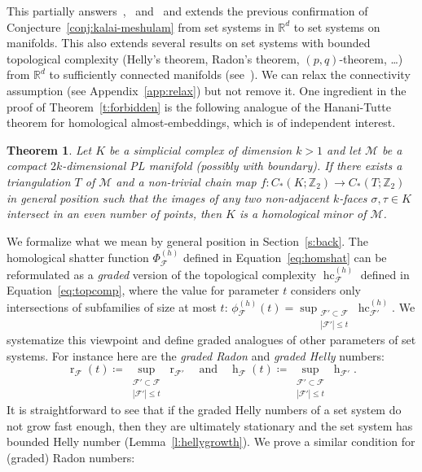 \documentclass[11pt]{article}
\newcommand{\R}{\mathbb{R}}
\newcommand{\Z}{\mathbb{Z}}
\newcommand{\F}{\mathcal{F}}
\newcommand{\M}{\mathcal{M}}
\DeclareMathOperator{\h}{h}
\DeclareMathOperator{\rad}{r}
\DeclareMathOperator{\hc}{hc}
\newcommand{\defn}[1]{\emph{\color{violet}#1}}
\newtheorem{theorem}{Theorem}
\begin{document}
%
\noindent
This partially answers~\cite[Problem~3]{patakova2022bounding},~\cite[Conjecture~1.7]{steppingUp} and~\cite[Conjecture~2]{patak2025sharper} and extends the previous confirmation of Conjecture~\ref{conj:kalai-meshulam} from set systems in $\R^d$ to set systems on manifolds. This also extends several results on set systems with bounded topological complexity (Helly's theorem, Radon's theorem, $(p,q)$-theorem, \ldots) from $\R^d$ to sufficiently connected manifolds (see~\cite{patakova2022bounding,steppingUp}). We can relax the connectivity assumption (see Appendix~\ref{app:relax}) but not remove it.
%
\medskip
%
 One ingredient in the proof of Theorem~\ref{t:forbidden} is the following analogue of the Hanani-Tutte theorem for homological almost-embeddings, which is of independent interest.
%
\begin{theorem}\label{t:HT}
  Let $K$ be a simplicial complex of dimension $k>1$ and let $\M$ be a compact
  $2k$-dimensional PL manifold (possibly with boundary). If there exists a triangulation $T$ of $\M$ and a non-trivial chain map $f:C_*(K; \Z_2)\to C_*(T; \Z_2)$ in
  general position such that the images of any two non-adjacent
  $k$-faces $\sigma,\tau\in K$ intersect in an even number of points,
  then $K$ is a homological minor of $\mathcal{M}$.
\end{theorem}
%
\noindent
We formalize what we mean by general position in Section~\ref{s:back}.
%
\medskip
%
The homological shatter function $\Phi_\F^{(h)}$ defined in Equation~\eqref{eq:homshat} can be reformulated as a \emph{graded} version of the topological complexity $\hc^{(h)}_\F$ defined in Equation~\eqref{eq:topcomp}, where the value for parameter $t$ considers only intersections of subfamilies of size at most $t$: $\phi_\F^{(h)}(t)= \sup_{\substack{\F'\subset\F\\ |\F'| \le t} }\hc^{(h)}_{\F'}$. We systematize this viewpoint and define graded analogues of other parameters of set systems. For instance here are the \defn{graded Radon} and \defn{graded Helly} numbers:
%
\begin{equation}
  \rad_\F(t) \coloneqq \sup \limits_{\substack{\F'\subset \F \\ |\F'|\leq t}} \rad_{\F'}
 \quad \text{and} \quad
 \h_\F(t) \coloneqq \sup\limits_{\substack{\F'\subset \F \\ |\F'|\leq t}} \h_{\F'}.
\end{equation}
%
\noindent
It is straightforward to see that if the graded Helly numbers of a set system do not grow fast enough, then they are ultimately stationary and the set system has bounded Helly number (Lemma~\ref{l:hellygrowth}). We prove a similar condition for (graded) Radon numbers:
\end{document}
